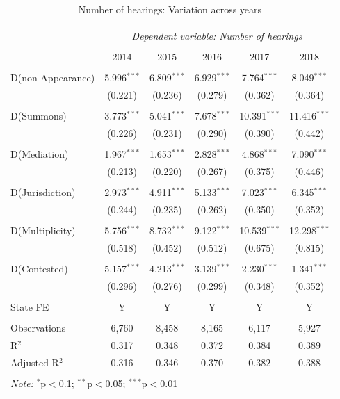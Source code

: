 \pagebreak

 \begin{longtable}{lcc|ccc} 
 \caption{Number of hearings: Variation across years}\label{tab:hearFE} 
 \\[-1.8ex] 
 \hline \\[-1.8ex] 
 & \multicolumn{5}{c}{\textit{Dependent variable: Number of hearings}} \\ 
 \cline{2-6} 
 \\[-1.8ex] & 2014 & 2015 & 2016 & 2017 & 2018 \\ 
 \hline \\[-1.8ex] 
 D(non-Appearance) & 5.996$^{***}$ & 6.809$^{***}$ & 6.929$^{***}$ & 7.764$^{***}$ & 8.049$^{***}$ \\ 
 & (0.221) & (0.236) & (0.279) & (0.362) & (0.364) \\ 
 & & & & & \\ 
 D(Summons) & 3.773$^{***}$ & 5.041$^{***}$ & 7.678$^{***}$ & 10.391$^{***}$ & 11.416$^{***}$ \\ 
 & (0.226) & (0.231) & (0.290) & (0.390) & (0.442) \\ 
 & & & & & \\ 
 D(Mediation) & 1.967$^{***}$ & 1.653$^{***}$ & 2.828$^{***}$ & 4.868$^{***}$ & 7.090$^{***}$ \\ 
 & (0.213) & (0.220) & (0.267) & (0.375) & (0.446) \\ 
 & & & & & \\ 
 D(Jurisdiction) & 2.973$^{***}$ & 4.911$^{***}$ & 5.133$^{***}$ & 7.023$^{***}$ & 6.345$^{***}$ \\ 
 & (0.244) & (0.235) & (0.262) & (0.350) & (0.352) \\ 
 & & & & & \\ 
 D(Multiplicity) & 5.756$^{***}$ & 8.732$^{***}$ & 9.122$^{***}$ & 10.539$^{***}$ & 12.298$^{***}$ \\ 
 & (0.518) & (0.452) & (0.512) & (0.675) & (0.815) \\ 
 & & & & & \\ 
 D(Contested) & 5.157$^{***}$ & 4.213$^{***}$ & 3.139$^{***}$ & 2.230$^{***}$ & 1.341$^{***}$ \\ 
 & (0.296) & (0.276) & (0.299) & (0.348) & (0.352) \\ 
 \hline \\[-1.8ex]
 State FE & Y & Y & Y & Y & Y \\
 \hline \\[-1.8ex] 
 Observations & 6,760 & 8,458 & 8,165 & 6,117 & 5,927 \\ 
 R$^{2}$ & 0.317 & 0.348 & 0.372 & 0.384 & 0.389 \\ 
 Adjusted R$^{2}$ & 0.316 & 0.346 & 0.370 & 0.382 & 0.388 \\ 
 \hline \\[-1.8ex] 
 \multicolumn{6}{l}{\textit{Note:} $^{*}$p$<$0.1; $^{**}$p$<$0.05; $^{***}$p$<$0.01} \\ 
 \end{longtable}
 

